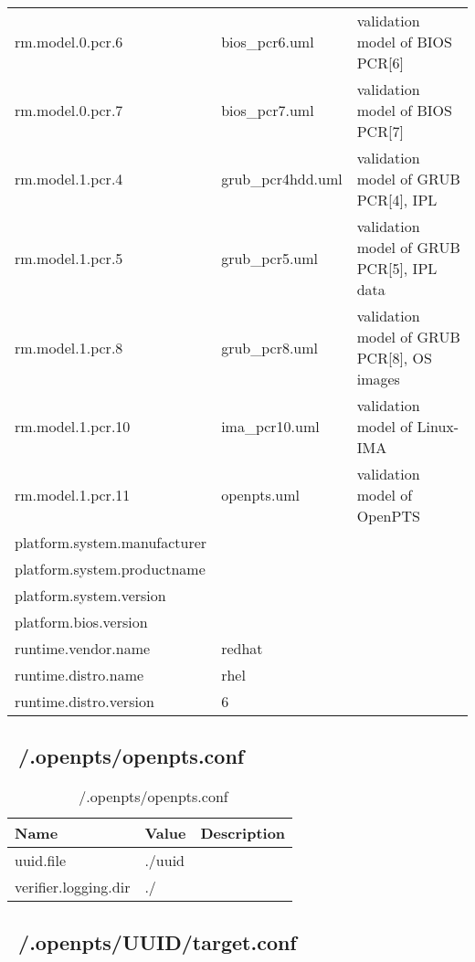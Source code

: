 \begin{table}[h]
\begin{center}
\begin{tabular}{lll}
    rm.model.0.pcr.6 & bios\_pcr6.uml & validation model of BIOS PCR[6]\\
    rm.model.0.pcr.7 & bios\_pcr7.uml & validation model of BIOS PCR[7]\\
    \hline
    rm.model.1.pcr.4 & grub\_pcr4hdd.uml & validation model of GRUB PCR[4], IPL\\
    rm.model.1.pcr.5 & grub\_pcr5.uml & validation model of GRUB PCR[5], IPL data\\
    rm.model.1.pcr.8 & grub\_pcr8.uml & validation model of GRUB PCR[8], OS images\\
    \hline
    rm.model.1.pcr.10 & ima\_pcr10.uml & validation model of Linux-IMA\\
    \hline
    rm.model.1.pcr.11 & openpts.uml & validation model of OpenPTS\\
    \hline
    platform.system.manufacturer & & \\
    platform.system.productname & & \\
    platform.system.version & & \\
    platform.bios.version & & \\
    \hline
    runtime.vendor.name & redhat & \\
    runtime.distro.name & rhel & \\
    runtime.distro.version & 6 & \\
    \hline
\end{tabular}
\end{center}
\end{table}

\clearpage
\subsection{~/.openpts/openpts.conf} 

\begin{table}[h]
\caption{~/.openpts/openpts.conf}
\label{table:openpts:conf}
\begin{center}
\begin{tabular}{lll}
    \hline
    Name & Value & Description  \\
    \hline  \hline
uuid.file & ./uuid & \\
verifier.logging.dir & ./ & \\
    \hline
\end{tabular}
\end{center}
\end{table}

\subsection{~/.openpts/UUID/target.conf} 

